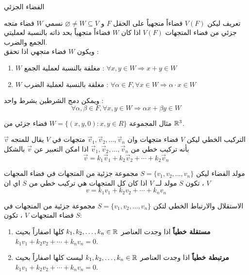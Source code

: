 \begin{frame}{الفضاء الجزئي}
\begin{exampleblock}{تعريف}
	ليكن $V(F)$ فضاءاً متجهياً على الحقل $F$ و $\varnothing \neq W\subseteq V$ نسمي $W$ فضاء متجه جزئي من فضاء المتجهات $V(F)$ اذا كان $W$ فضاءاً متجهياً بحد ذاته بالنسبة لعمليتي الجمع والضرب.\\
	\noindent
	ويكون $W$ فضاء متجهي اذا تحقق :
	\begin{enumerate}
		\item $W$ مغلقة بالنسبة لعملية الجمع : $\forall x, y \in W \Rightarrow x+y \in W$
		\item $W$ مغلقة بالنسبة لعملية الضرب : $\forall \alpha \in F,\forall x \in W \Rightarrow \alpha\cdot x\in W$
	\end{enumerate}
	
	\pause
	ويمكن دمج الشرطين بشرط واحد :
	\[
	\forall \alpha, \beta \in F , \forall x, y \in W \Rightarrow \alpha x + \beta y \in W
	\]
\end{exampleblock}

\pause
\begin{exampleblock}{مثال}
	المجموعة
	$W = \{(x, y, 0) : x, y\in R\}$
	فضاء جزئي من $\mathbb{R}^3$.
\end{exampleblock}
\end{frame}

\begin{frame}
\begin{exampleblock}{التركيب الخطي}
	ليكن $V$ فضاء متجهات وان 
	$\vec{v}_1, \vec{v}_2,\dots, \vec{v}_n$
	متجهات في $V$ يقال للمتجه $\vec{v}$ بأنه تركيب خطي من $\vec{v}_1, \vec{v}_2,\dots, \vec{v}_n$ اذا امكن التعبير عن $\vec{v}$ بالشكل 
	\[
	\vec{v} = k_1\vec{v}_1+k_2\vec{v}_2+\cdots +k_2\vec{v}_n
	\]
\end{exampleblock}

\pause
\begin{exampleblock}{مولد الفضاء}
	ليكن $S = \{v_1, v_2, \dots, v_n\}$ مجموعة جزئية من المتجهات في فضاء المجهات $V$ ، تكون $S$ مولد لــ $V$ اذا كان كل المتجهات هي تركيب خطي من $S$ اي ان
	\[
	v = k_1v_1 + k_2v_2 + \cdots + k_nv_n
	\]
\end{exampleblock}
\end{frame}

\begin{frame}
	\begin{exampleblock}{الاستقلال والارتباط الخطي}
		لتكن $S=\{v_1, v_2, \dots, v_n\}$ مجموعة جزئية من المتجهات في فضاء المتجهات $V$ ، تكون $S$:
		\begin{enumerate}
			\item \textbf{مستقلة خطياً} اذا وجدت العناصر $k_1, k_2, \dots, k_n\in \mathbb{R}$ كلها اصفاراً بحيث \\$k_1v_1 + k_2v_2 + \cdots + k_n v_n = 0$.
			\item \textbf{مرتبطة خطياً} اذا وجدت العناصر $k_1, k_2, \dots, k_n\in \mathbb{R}$ ليست  كلها اصفاراً بحيث \\$k_1v_1 + k_2v_2 + \cdots + k_n v_n = 0$.
		\end{enumerate}
	\end{exampleblock}
\end{frame}

